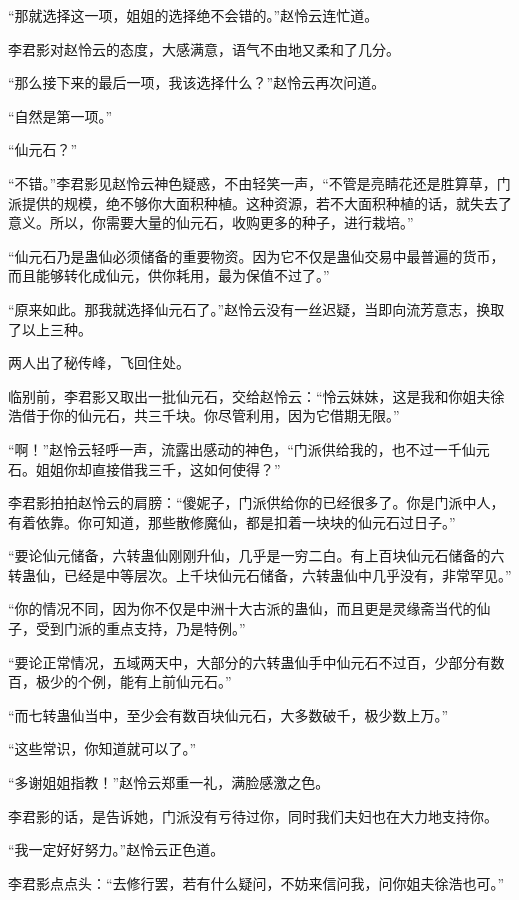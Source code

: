 \begin{this_body}
“那就选择这一项，姐姐的选择绝不会错的。”赵怜云连忙道。

李君影对赵怜云的态度，大感满意，语气不由地又柔和了几分。

“那么接下来的最后一项，我该选择什么？”赵怜云再次问道。

“自然是第一项。”

“仙元石？”

“不错。”李君影见赵怜云神色疑惑，不由轻笑一声，“不管是亮睛花还是胜算草，门派提供的规模，绝不够你大面积种植。这种资源，若不大面积种植的话，就失去了意义。所以，你需要大量的仙元石，收购更多的种子，进行栽培。”

“仙元石乃是蛊仙必须储备的重要物资。因为它不仅是蛊仙交易中最普遍的货币，而且能够转化成仙元，供你耗用，最为保值不过了。”

“原来如此。那我就选择仙元石了。”赵怜云没有一丝迟疑，当即向流芳意志，换取了以上三种。

两人出了秘传峰，飞回住处。

临别前，李君影又取出一批仙元石，交给赵怜云：“怜云妹妹，这是我和你姐夫徐浩借于你的仙元石，共三千块。你尽管利用，因为它借期无限。”

“啊！”赵怜云轻呼一声，流露出感动的神色，“门派供给我的，也不过一千仙元石。姐姐你却直接借我三千，这如何使得？”

李君影拍拍赵怜云的肩膀：“傻妮子，门派供给你的已经很多了。你是门派中人，有着依靠。你可知道，那些散修魔仙，都是扣着一块块的仙元石过日子。”

“要论仙元储备，六转蛊仙刚刚升仙，几乎是一穷二白。有上百块仙元石储备的六转蛊仙，已经是中等层次。上千块仙元石储备，六转蛊仙中几乎没有，非常罕见。”

“你的情况不同，因为你不仅是中洲十大古派的蛊仙，而且更是灵缘斋当代的仙子，受到门派的重点支持，乃是特例。”

“要论正常情况，五域两天中，大部分的六转蛊仙手中仙元石不过百，少部分有数百，极少的个例，能有上前仙元石。”

“而七转蛊仙当中，至少会有数百块仙元石，大多数破千，极少数上万。”

“这些常识，你知道就可以了。”

“多谢姐姐指教！”赵怜云郑重一礼，满脸感激之色。

李君影的话，是告诉她，门派没有亏待过你，同时我们夫妇也在大力地支持你。

“我一定好好努力。”赵怜云正色道。

李君影点点头：“去修行罢，若有什么疑问，不妨来信问我，问你姐夫徐浩也可。”


\end{this_body}
